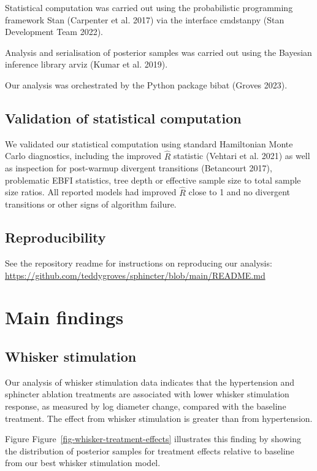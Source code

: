 \documentclass[
  letterpaper,
  DIV=11,
  numbers=noendperiod,
  oneside]{scrartcl}
\theoremstyle{plain}
\theoremstyle{remark}
\begin{document}
Statistical computation was carried out using the probabilistic
programming framework Stan (Carpenter et al. 2017) via the interface
cmdstanpy (Stan Development Team 2022).

Analysis and serialisation of posterior samples was carried out using
the Bayesian inference library arviz (Kumar et al. 2019).

Our analysis was orchestrated by the Python package bibat (Groves 2023).

\subsection{Validation of statistical
computation}\label{validation-of-statistical-computation}

We validated our statistical computation using standard Hamiltonian
Monte Carlo diagnostics, including the improved \(\hat{R}\) statistic
(Vehtari et al. 2021) as well as inspection for post-warmup divergent
transitions (Betancourt 2017), problematic EBFI statistics, tree depth
or effective sample size to total sample size ratios. All reported
models had improved \(\hat{R}\) close to 1 and no divergent transitions
or other signs of algorithm failure.

\subsection{Reproducibility}\label{reproducibility}

See the repository readme for instructions on reproducing our analysis:
\url{https://github.com/teddygroves/sphincter/blob/main/README.md}

\section{Main findings}\label{main-findings}

\subsection{Whisker stimulation}\label{whisker-stimulation}

Our analysis of whisker stimulation data indicates that the hypertension
and sphincter ablation treatments are associated with lower whisker
stimulation response, as measured by log diameter change, compared with
the baseline treatment. The effect from whisker stimulation is greater
than from hypertension.

Figure Figure~\ref{fig-whisker-treatment-effects} illustrates this
finding by showing the distribution of posterior samples for treatment
effects relative to baseline from our best whisker stimulation model.
\end{document}
